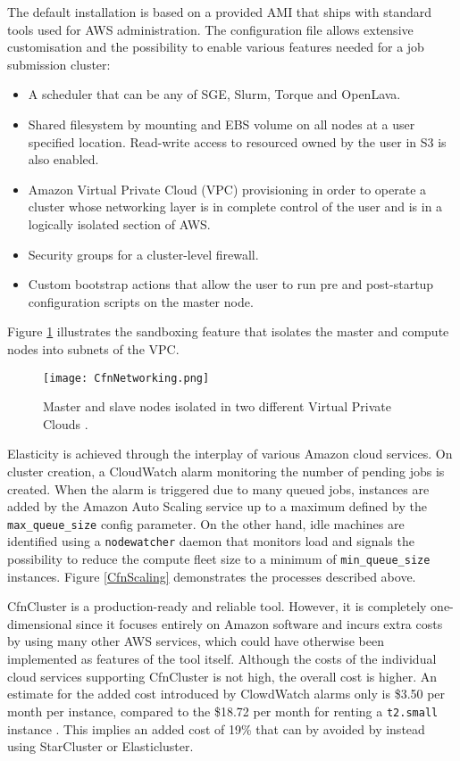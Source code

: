 The default installation is based on a provided AMI that ships with standard tools used for AWS administration. The configuration file allows extensive customisation and the possibility to enable various features needed for a job submission cluster:
\begin{itemize}
	\item A scheduler that can be any of SGE, Slurm, Torque and OpenLava\cite{OpenLava}.
	\item Shared filesystem by mounting and EBS volume on all nodes at a user specified location. Read-write access to resourced owned by the user in S3 is also enabled.
	\item Amazon Virtual Private Cloud (VPC) provisioning in order to operate a cluster whose networking layer is in complete control of the user and is in a logically isolated section of AWS.
	\item Security groups for a cluster-level firewall.
	\item Custom bootstrap actions that allow the user to run pre and post-startup configuration scripts on the master node.
\end{itemize}

Figure \ref{CfnNetworking} illustrates the sandboxing feature that isolates the master and compute nodes into subnets of the VPC.

\begin{figure}[h]
	\centering
		\texttt{[image: CfnNetworking.png]}
	\caption{Master and slave nodes isolated in two different Virtual Private Clouds \cite{CfnVPC}.}
	\label{CfnNetworking}
\end{figure}

Elasticity is achieved through the interplay of various Amazon cloud services. On cluster creation, a CloudWatch alarm monitoring the number of pending jobs is created. When the alarm is triggered due to many queued jobs, instances are added by the Amazon Auto Scaling service up to a maximum defined by the \verb|max_queue_size| config parameter. On the other hand, idle machines are identified using a \verb|nodewatcher| daemon that monitors load and signals the possibility to reduce the compute fleet size to a minimum of \verb|min_queue_size| instances. Figure \ref{CfnScaling} demonstrates the processes described above.

CfnCluster is a production-ready and reliable tool. However, it is completely one-dimensional since it focuses entirely on Amazon software and incurs extra costs by using many other AWS services, which could have otherwise been implemented as features of the tool itself. Although the costs of the individual cloud services supporting CfnCluster is not high, the overall cost is higher. An estimate for the added cost introduced by ClowdWatch alarms only is \$3.50 per month per instance, compared to the \$18.72 per month for renting a \verb|t2.small| instance \cite{AWSPricing}. This implies an added cost of 19\% that can by avoided by instead using StarCluster or Elasticluster.

